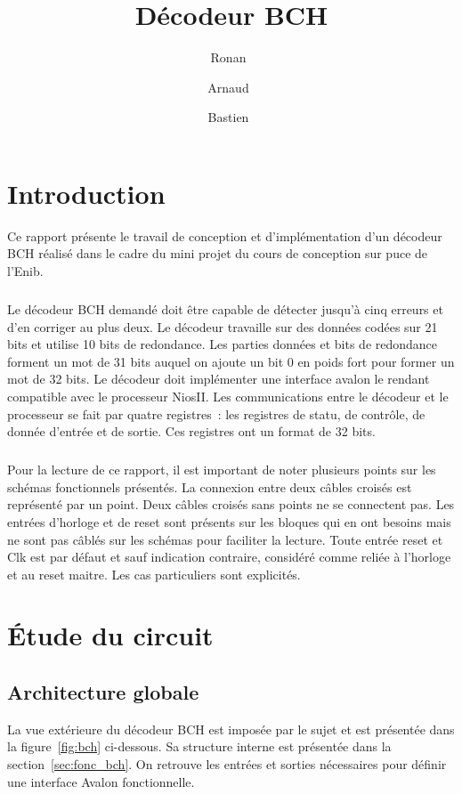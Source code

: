 \documentclass[a4paper, 11pt, svgnames]{report}
\title{Décodeur BCH}
\author{Ronan~\bsc{Le Guillou} \and Arnaud~\bsc{Levaufre} \and Bastien~\bsc{Orivel}}
\begin{document}
    \maketitle
    \tableofcontents
    \listoffigures

    \chapter{Introduction}

    Ce rapport présente le travail de conception et d'implémentation d'un
    décodeur BCH réalisé dans le cadre du mini projet du cours de conception
    sur puce de l'Enib.

    \paragraph{}
    Le décodeur BCH demandé doit être capable de détecter jusqu'à cinq erreurs
    et d'en corriger au plus deux. Le décodeur travaille sur des données codées
    sur 21 bits et utilise 10 bits de redondance. Les parties données et bits de
    redondance forment un mot de 31 bits auquel on ajoute un bit 0 en poids fort
    pour former un mot de 32 bits. Le décodeur doit implémenter une interface
    avalon le rendant compatible avec le processeur NiosII. Les communications
    entre le décodeur et le processeur se fait par quatre registres~: les
    registres de statu, de contrôle, de donnée d'entrée et de sortie. Ces
    registres ont un format de 32 bits.

    \paragraph{}
    Pour la lecture de ce rapport, il est important de noter plusieurs points
    sur les schémas fonctionnels présentés. La connexion entre deux câbles
    croisés est représenté par un point. Deux câbles croisés sans points ne se
    connectent pas. Les entrées d'horloge et de reset sont présents sur les
    bloques qui en ont besoins mais ne sont pas câblés sur les schémas pour
    faciliter la lecture. Toute entrée reset et Clk est par défaut et sauf
    indication contraire, considéré comme reliée à l'horloge et au reset
    maitre. Les cas particuliers sont explicités.

    \chapter{Étude du circuit}
        \section{Architecture globale}
        La vue extérieure du décodeur BCH est imposée par le sujet et est
        présentée dans la figure~\ref{fig:bch} ci-dessous. Sa structure
        interne est présentée dans la section~\ref{sec:fonc_bch}. On
        retrouve les entrées et sorties nécessaires pour définir une
        interface Avalon fonctionnelle.
\end{document}
